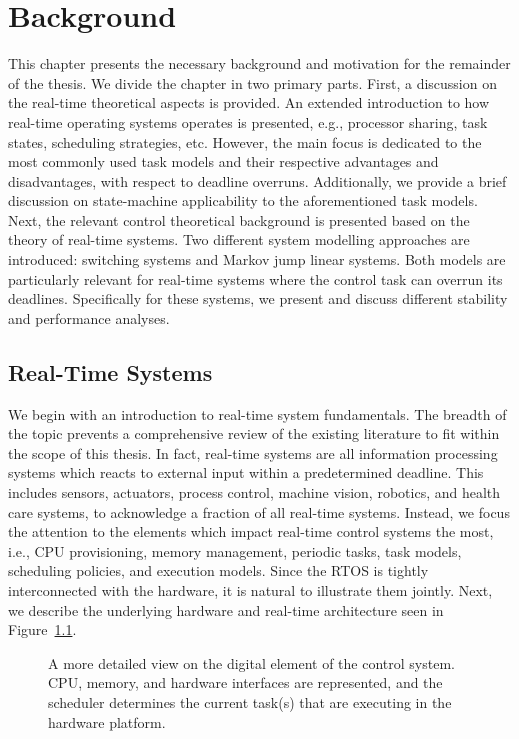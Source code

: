 \chapter{Background}%
\label{ch:background}%

This chapter presents the necessary background and motivation for the remainder of the thesis.
We divide the chapter in two primary parts.
First, a discussion on the real-time theoretical aspects is provided.
An extended introduction to how real-time operating systems operates is presented, e.g., processor sharing, task states, scheduling strategies, etc.
However, the main focus is dedicated to the most commonly used task models and their respective advantages and disadvantages, with respect to deadline overruns.
Additionally, we provide a brief discussion on state-machine applicability to the aforementioned task models. 
Next, the relevant control theoretical background is presented based on the theory of real-time systems.
Two different system modelling approaches are introduced: switching systems and Markov jump linear systems.
Both models are particularly relevant for real-time systems where the control task can overrun its deadlines.
Specifically for these systems, we present and discuss different stability and performance analyses.

\section{Real-Time Systems}%
\label{sec:background:rts}%
%
We begin with an introduction to real-time system fundamentals. 
The breadth of the topic prevents a comprehensive review of the existing literature to fit within the scope of this thesis.
In fact, real-time systems are all information processing systems which reacts to external input within a predetermined deadline. 
This includes sensors, actuators, process control, machine vision, robotics, and health care systems, to acknowledge a fraction of all real-time systems.
Instead, we focus the attention to the elements which impact real-time control systems the most, i.e., CPU provisioning, memory management, periodic tasks, task models, scheduling policies, and execution models.
Since the RTOS is tightly interconnected with the hardware, it is natural to illustrate them jointly.
Next, we describe the underlying hardware and real-time architecture seen in Figure~\ref{fig:operating-system-abstraction}.
%
\begin{figure}[t]
    \centering
    \caption{A more detailed view on the digital element of the control system. CPU, memory, and hardware interfaces are represented, and the scheduler determines the current task(s) that are executing in the hardware platform.}%
    \label{fig:operating-system-abstraction}%
\end{figure}

